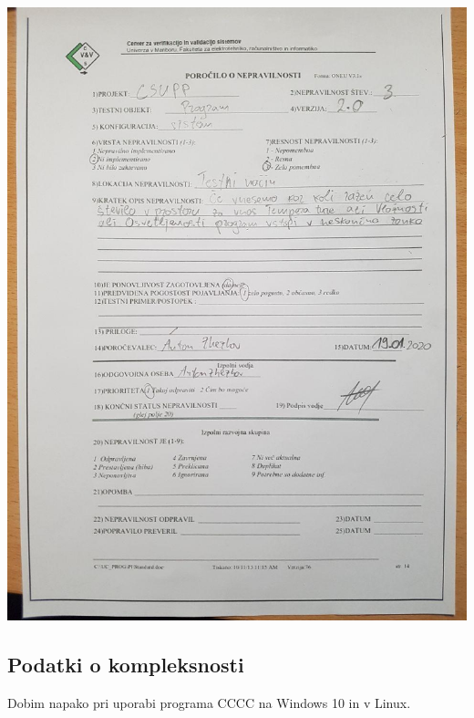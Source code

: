 \documentclass[a4paper,12pt]{article}
\begin{document}
{	\includegraphics[width=15cm]{porocila/10.jpg}

}

\newpage

	\subsection{Podatki o kompleksnosti}

	\qquad Dobim napako pri uporabi programa CCCC na Windows 10 in v Linux.

	\vspace{2cm}
\end{document}
